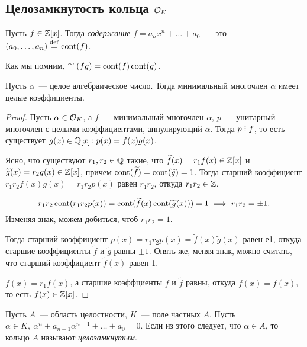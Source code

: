  	\subsection{Целозамкнутость кольца $\mathcal{O}_{K}$}

 	\begin{definition} 
 		Пусть $f \in \mathbb{Z}[x]$. Тогда \emph{содержание} $f = a_n x^n + \ldots + a_0$~--- это $(a_0, \ldots, a_n) \stackrel{\mathrm{def}}{=} \operatorname{cont}(f)$.
 	\end{definition}
 	\begin{remark}
 		Как мы помним, $\cong(f g) = \operatorname{cont}(f)\operatorname{cont}(g)$.
 	\end{remark}

 	\begin{theorem} 
 		Пусть $\alpha$~--- целое алгебраическое число. Тогда минимальный многочлен $\alpha$ имеет целые коэффициенты. 
 	\end{theorem}
 	\begin{proof}
 		Пусть $\alpha \in \mathcal{O}_{K}$, а $f$~--- минимальный многочлен $\alpha$, $p$~--- унитарный многочлен с целыми коэффициентами, аннулирующий $\alpha$. Тогда $p \divby f$, то есть существует $g(x) \in \mathbb{Q}[x]\colon p(x) = f(x) g(x)$. 

 		Ясно, что существуют $r_1, r_2 \in \mathbb{Q}$ такие, что $\widetilde{f}(x) = r_1 f(x) \in \mathbb{Z}[x]$ и $\widetilde{g}(x) = r_2 g(x) \in \mathbb{Z}[x]$, причем $\operatorname{cont}(\widetilde{f}) = \operatorname{cont}(\widetilde{g}) = 1$. Тогда старший коэффициент $r_1 r_2 f(x) g(x) = r_1 r_2 p(x)$  равен $r_1 r_2$, откуда $r_1 r_2 \in \mathbb{Z}$. 

 		\[
 			r_1 r_2 \operatorname{cont}(r_1 r_2 p(x)) = \operatorname{cont}(\widetilde{f}(x) \operatorname{cont}(\widetilde{g}(x))) = 1 \implies r_1 r_2 = \pm 1. 
 		\]
 		Изменяя знак, можем добиться, чтоб $r_1 r_2 = 1$.  

 		Тогда старший коэффициент $p(x) = r_1 r_2 p(x) = \widetilde{f}(x) \widetilde{g}(x)$ равен е1, откуда старшие коэффициенты $\widetilde{f}$ и $\widetilde{g}$ равны  $\pm 1$. Опять же, меняя знак, можно считать, что старший коэффициент $\widetilde{f}(x)$ равен 1. 

 		$\widetilde{f}(x) = r_1 f(x)$, а старшие коэффциенты $f$ и $\widetilde{f}$ равны, откуда $\widetilde{f}(x) = f(x)$, то есть $f(x) \in \mathbb{Z}[x]$.
 	\end{proof}

 	\begin{definition} 
 		Пусть $A$~--- область целостности, $K$~--- поле частных $A$. Пусть $\alpha \in K, \ \alpha^n + a_{n - 1}\alpha^{n - 1} + \ldots + a_0 = 0$. Если из этого следует, что $\alpha \in A$, то кольцо $A$ называют \emph{целозамкнутым}. 
 	\end{definition}

